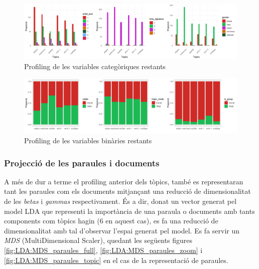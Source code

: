 \begin{figure}[H]
    \centering
    \includegraphics[width=0.95\linewidth]{Images/8_Textual/LDA/profiling_cats_2.png}
    \caption{Profiling de les variables categòriques restants}
    \label{fig:LDA:cat2_profiling}
\end{figure}

\begin{figure}[H]
    \centering
    \includegraphics[width=0.95\linewidth]{Images/8_Textual/LDA/profiling_bins_2.png}
    \caption{Profiling de les variables binàries restants}
    \label{fig:LDA:bin2_profiling}
\end{figure}


\subsubsection{Projecció de les paraules i documents}

A més de dur a terme el profiling anterior dels tòpics, també es representaran tant les paraules com els documents mitjançant una reducció de dimensionalitat de les \textit{betas} i \textit{gammas} respectivament. És a dir, donat un vector generat pel model LDA que representi la importància de una paraula o documents amb tants components com tòpics hagin (6 en aquest cas), es fa una reducció de dimensionalitat amb tal d'observar l'espai generat pel model. Es fa servir un \textit{MDS} (MultiDimensional Scaler), quedant les següents figures \ref{fig:LDA:MDS_paraules_full}, \ref{fig:LDA:MDS_paraules_zoom} i \ref{fig:LDA:MDS_paraules_topic} en el cas de la representació de paraules.

